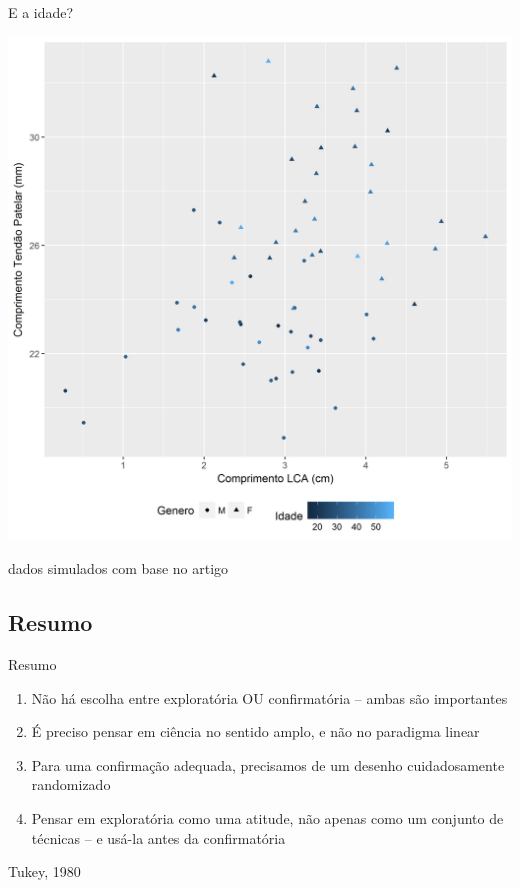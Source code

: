 \documentclass{beamer}
\begin{document}
\begin{frame}{\scriptsize E a idade?}
  \begin{center}
    \includegraphics[height=.8\textheight]{EDA/EDA-corr3}
  \end{center}

  \vfill
  \tiny
  \hfill dados simulados com base no artigo
\end{frame}

\subsection{Resumo}

\begin{frame}{Resumo}
  \begin{enumerate}
    \scriptsize
  \item Não há escolha entre exploratória OU confirmatória -- ambas são importantes
    \bigskip
  \item É preciso pensar em ciência no sentido amplo, e não no paradigma linear
    \bigskip
  \item Para uma confirmação adequada, precisamos de um desenho cuidadosamente randomizado
    \bigskip
  \item Pensar em exploratória como uma atitude, não apenas como um conjunto de técnicas -- e usá-la antes da confirmatória
  \end{enumerate}

  \vfill
  \scriptsize
  \hfill Tukey, 1980
\end{frame}
\end{document}
